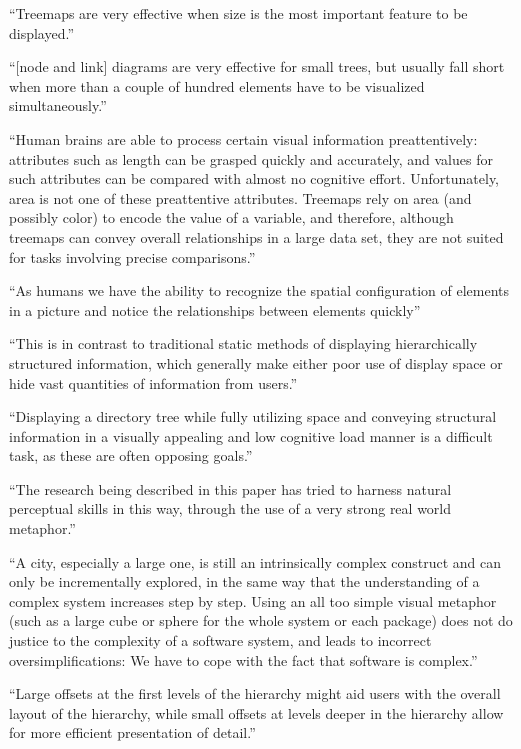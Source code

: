 \enquote{Treemaps are very effective when size is the most important feature to be displayed.}\cite[2]{bruls2000squarified}


\enquote{[node and link] diagrams are very effective for small trees, but usually fall short when more than a couple of hundred elements have to be visualized simultaneously.}\cite[2]{bruls2000squarified}

\enquote{Human brains are able to process certain visual information preattentively: attributes such as length can be grasped quickly and accurately, and values for such attributes can be compared with almost no cognitive effort. Unfortunately, area is not one of these preattentive attributes. Treemaps rely on area (and possibly color) to encode the value of a variable, and therefore, although treemaps can convey overall relationships in a large data set, they are not suited for tasks involving precise comparisons.}\cite{laubheimer_2019}

\enquote{As humans we have the ability to recognize the spatial configuration of elements in a picture and notice the relationships between elements quickly}\cite[2]{johnson1998tree}

\enquote{This is in contrast to traditional static methods of displaying
hierarchically structured information, which generally make either poor use of
display space or hide vast quantities of information from users.}\cite[2]{johnson1998tree}

\enquote{Displaying a directory tree while fully utilizing space and conveying structural information in a visually appealing and low cognitive load manner is a difficult task, as these are often opposing goals.}\cite[8]{johnson1998tree}

\enquote{The research being described in this paper has tried to harness natural perceptual skills in this way, through the use of a very strong real world metaphor.}\cite[2]{virtualButVisibleMunro}

\enquote{A city, especially a large one, is still an intrinsically complex construct and can only be incrementally explored, in the same way that the understanding of a complex system increases step by step. Using an all too simple visual metaphor (such as a large cube or sphere for the whole system or each package) does not do justice to the complexity of a software system, and leads to incorrect oversimplifications: We have to cope with the fact that software is complex.}\cite[2]{codeCity1}

\enquote{Large offsets at the first levels of the hierarchy might aid users with the overall layout of the hierarchy, while small offsets at levels deeper in the hierarchy allow for more efficient presentation of detail.}\cite[52]{johnson1993treemapsPhd}

